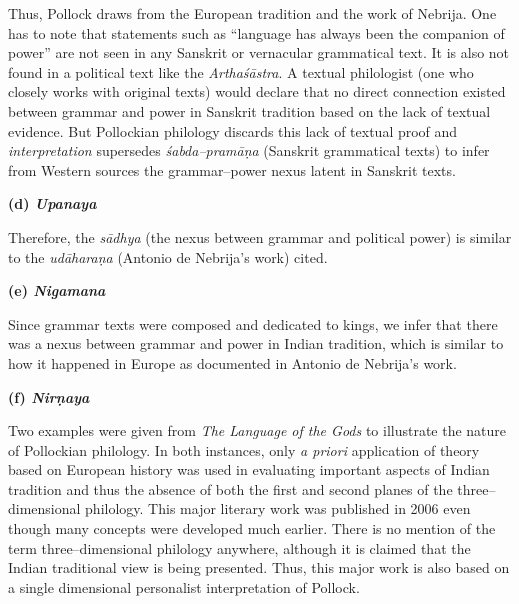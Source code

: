 Thus, Pollock draws from the European tradition and the work of Nebrija. One has to note that statements such as “language has always been the companion of power” are not seen in any Sanskrit or vernacular grammatical text. It is also not found in a political text like the \textit{Arthaśāstra}. A textual philologist (one who closely works with original texts) would declare that no direct connection existed between grammar and power in Sanskrit tradition based on the lack of textual evidence. But Pollockian philology discards this lack of textual proof and \textit{interpretation} supersedes \textit{śabda–pramāṇa} (Sanskrit grammatical texts) to infer from Western sources the grammar–power nexus latent in Sanskrit texts.

\textbf{(d) \textit{Upanaya}}

Therefore, the \textit{sādhya} (the nexus between grammar and political power) is similar to the \textit{udāharaṇa} (Antonio de Nebrija’s work) cited.

\textbf{(e) \textit{Nigamana}}

Since grammar texts were composed and dedicated to kings, we infer that there was a nexus between grammar and power in Indian tradition, which is similar to how it happened in Europe as documented in Antonio de Nebrija’s work.

\textbf{(f) \textit{Nirṇaya}}

Two examples were given from \textit{The Language of the Gods} to illustrate the nature of Pollockian philology. In both instances, only \textit{a priori} application of theory based on European history was used in evaluating important aspects of Indian tradition and thus the absence of both the first and second planes of the three–dimensional philology. This major literary work was published in 2006 even though many concepts were developed much earlier. There is no mention of the term three–dimensional philology anywhere, although it is claimed that the Indian traditional view is being presented. Thus, this major work is also based on a single dimensional personalist interpretation of Pollock.

